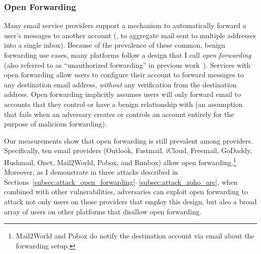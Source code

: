 \subsubsection{Open Forwarding}
\label{subsubsec:open_forwarding}
Many email service providers support a mechanism to automatically
forward a user's messages to another account (\eg, to aggregate mail
sent to multiple addresses into a single inbox).  Because of the
prevalence of these common, benign forwarding use cases, many
platforms follow a design that I call \emph{open forwarding} (also
referred to as ``unauthorized forwarding'' in previous work~\cite{shen2020weak}).  Services with open forwarding allow users
to configure their account to forward messages to any destination
email address, \textit{without} any verification from the destination
address.  Open forwarding implicitly assumes users will only forward
email to accounts that they control or have a benign relationship with
(an assumption that fails when an adversary creates or controls an account
entirely for the purpose of malicious forwarding).




Our measurements show that open forwarding is still prevalent among providers.
Specifically, ten email providers (Outlook, Fastmail, iCloud, Freemail, GoDaddy, Hushmail,
Onet, Mail2World, Pobox, and Runbox) allow open
forwarding.\footnote{Mail2World and Pobox do notify the destination account
via email about the forwarding setup.}  Moreover, as I demonstrate in three
attacks described in
Sections~\ref{subsec:attack_open_forwarding}--\ref{subsec:attack_zoho_arc},
when combined with other vulnerabilities, adversaries can exploit open
forwarding to attack not only users on those providers that employ
this design, but also a broad array of users on other platforms that
disallow open forwarding.




